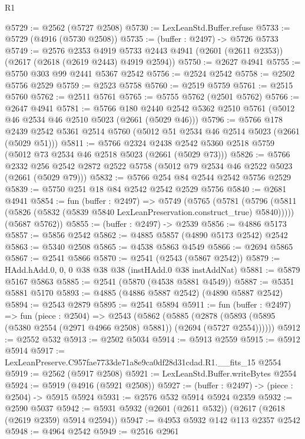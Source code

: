 \begin{lexlean}{R1}
\begin{coremodule}
@5729 := @2562 (@5727 @2508)
@5730 := LexLeanStd.Buffer.refuse
@5733 := @5729 (@4916 (@5730 @2508))
@5735 := (buffer : @2497) -> @5726 @5733
@5749 := @2576
    @2353
    @4919
    @5733
    @2443
    @4941
    (@2601 (@2611 @2353))
    (@2617 (@2618 (@2619 @2443) @4919 @2594))
@5750 := @2627 @4941
@5755 := @5750 @303 @99 @2441 @5367 @2542
@5756 := @2524 @2542
@5758 := @2502 @5756 @2529
@5759 := @2523 @5758
@5760 := @2519 @5759
@5761 := @2515 @5760
@5762 := @2511 @5761
@5765 := @5755 @5762 (@2501 @5762)
@5766 := @2647 @4941
@5781 := @5766
    @180
    @2440
    @2542
    @5362
    @2510
    @5761
    (@5012 @46 @2534 @46 @2510 @5023 (@2661 (@5029 @46)))
@5796 := @5766
    @178
    @2439
    @2542
    @5361
    @2514
    @5760
    (@5012 @51 @2534 @46 @2514 @5023 (@2661 (@5029 @51)))
@5811 := @5766
    @2324
    @2438
    @2542
    @5360
    @2518
    @5759
    (@5012 @73 @2534 @46 @2518 @5023 (@2661 (@5029 @73)))
@5826 := @5766
    @2332
    @256
    @2542
    @2872
    @2522
    @5758
    (@5012 @79 @2534 @46 @2522 @5023 (@2661 (@5029 @79)))
@5832 := @5766 @254 @84 @2544 @2542 @5756 @2529
@5839 := @5750 @251 @18 @84 @2542 @2542 @2529 @5756
@5840 := @2681 @4941
@5854 := fun (buffer : @2497) =>
  @5749
    (@5765
      (@5781 (@5796 (@5811 (@5826 (@5832 (@5839 @5840 LexLeanPreservation.construct_true) @5840)))))
      (@5687 @5762))
@5855 := (buffer : @2497) -> @2539
@5856 := @4886 @5173
@5857 := @5856 @2542
@5862 := @4885 @5857 (@4890 @5173 @2542) @2542
@5863 := @5340 @2508
@5865 := @4538 @5863 @4549
@5866 := @2694 @5865
@5867 := @2541 @5866
@5870 := @2541 (@2543 (@5867 @2542))
@5879 := HAdd.hAdd.{0, 0, 0} @38 @38 @38 (instHAdd.{0} @38 instAddNat)
@5881 := @5879 @5167 @5863
@5885 := @2541 (@5870 (@4538 @5881 @4549))
@5887 := @5351 @5881 @5170
@5893 := @4885 (@4886 @5887 @2542) (@4890 @5887 @2542)
@5894 := @2543 @2879
@5895 := @2541 @5894
@5911 := fun (buffer : @2497) =>
  fun (piece : @2504) =>
  @2543
    (@5862
      (@5885 (@2878 (@5893 (@5895 (@5380 @2554 (@2971 @4966 @2508) @5881)) (@2694 (@5727 @2554))))))
@5912 := @2552 @532
@5913 := @2502 @5034
@5914 := @5913 @2559
@5915 := @5912 @5914
@5917 := LexLeanPreserve.C957fae7733de71a8e9ca0df28d31cdad.R1.__fits_15 @2554
@5919 := @2562 (@5917 @2508)
@5921 := LexLeanStd.Buffer.writeBytes @2554
@5924 := @5919 (@4916 (@5921 @2508))
@5927 := (buffer : @2497) -> (piece : @2504) -> @5915 @5924
@5931 := @2576 @532 @5914 @5924 @2359
@5932 := @2590 @5037
@5942 := @5931 @5932 (@2601 (@2611 @532)) (@2617 (@2618 (@2619 @2359) @5914 @2594))
@5947 := @4953 @5932 @142 @113 @2357 @2542
@5948 := @4964 @2542
@5949 := @2516 @2961

\end{coremodule}
\end{lexlean}
